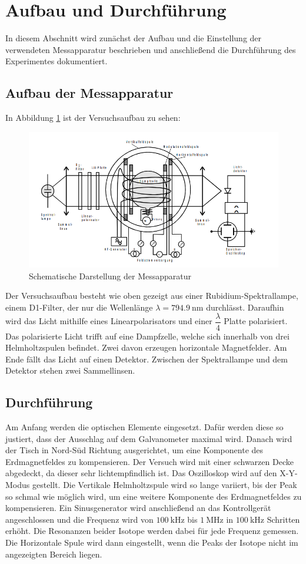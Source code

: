 \section{Aufbau und Durchführung}
\label{sec:Durchführung}
In diesem Abschnitt wird zunächst der Aufbau und die Einstellung der verwendeten Messapparatur beschrieben und anschließend die Durchführung des Experimentes dokumentiert.
\subsection{Aufbau der Messapparatur}
In Abbildung \ref{fig:aufbauop} ist der Versuchsaufbau zu sehen:
\begin{figure}[h!]
  \centering
  \includegraphics[scale=0.55]{fig/aufbauop.png}
  \caption{Schematische Darstellung der Messapparatur \cite{Anleitung1}}
  \label{fig:aufbauop}
\end{figure}
Der Versuchsaufbau besteht wie oben gezeigt aus einer Rubidium-Spektrallampe, einem D1-Filter, der nur die Wellenlänge $\lambda=\SI{794.9}{\nano\meter}$ durchlässt. Daraufhin wird das Licht mithilfe eines Linearpolarisators und einer $\dfrac{\lambda}{4}$ Platte polarisiert.
Das polarisierte Licht trifft auf eine Dampfzelle, welche sich innerhalb von drei Helmholtzspulen befindet. Zwei davon erzeugen horizontale Magnetfelder. Am Ende fällt das Licht auf einen Detektor.
Zwischen der Spektrallampe und dem Detektor stehen zwei Sammellinsen.
\subsection{Durchführung}
Am Anfang werden die optischen Elemente eingesetzt. Dafür werden diese so justiert, dass der Ausschlag auf dem Galvanometer maximal wird.
Danach wird der Tisch in Nord-Süd Richtung ausgerichtet, um eine Komponente des Erdmagnetfeldes zu kompensieren. Der Versuch wird mit einer schwarzen Decke abgedeckt, da dieser sehr lichtempfindlich ist.
Das Oszilloskop wird auf den X-Y-Modus gestellt. Die Vertikale Helmholtzspule wird so lange variiert, bis der Peak so schmal wie möglich wird, um eine weitere Komponente des Erdmagnetfeldes zu kompensieren.
 Ein Sinusgenerator wird anschließend an das Kontrollgerät angeschlossen und die Frequenz wird von $\SI{100}{\kilo\hertz}$ bis $\SI{1}{\mega\hertz}$ in $\SI{100}{\kilo\hertz}$ Schritten erhöht. Die Resonanzen beider Isotope werden dabei für jede Frequenz gemessen. Die Horizontale Spule wird dann eingestellt, wenn die Peaks der Isotope nicht im angezeigten Bereich liegen.
